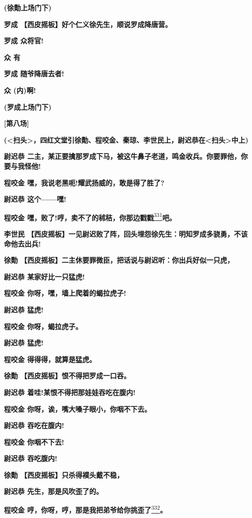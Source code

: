 \textbf{(徐勣上场门下)}

\textbf{罗成 【西皮摇板】好个仁义徐先生，顺说罗成降唐营。}

\textbf{罗成 众将官!}

\textbf{众 有}

\textbf{罗成 随爷降唐去者!}

\textbf{众 (内)啊!}

\textbf{(罗成上场门下)}

\textbf{{[}第八场{]}}

\textbf{(\textless{}扫头\textgreater{}，四红文堂引徐勣、程咬金、秦琼、李世民上，尉迟恭在\textless{}扫头\textgreater{}中上)}

\textbf{尉迟恭
二主，某正要擒那罗成下马，被这牛鼻子老道，鸣金收兵。你要罪他，你要与我怪他!}

\textbf{程咬金 嘿，我说老黑呃!耀武扬威的，敢是得了胜了?}

\textbf{尉迟恭 这个------嘿!}

\textbf{程咬金
嘿，败了!哼，卖不了的秫秸，你那边戳戳}\protect\hyperlink{fn331}{\textsuperscript{331}}\textbf{吧。}

\textbf{李世民
【西皮摇板】一见尉迟败了阵，回头埋怨徐先生：明知罗成多骁勇，不该命他去出兵!}

\textbf{徐勣
【西皮摇板】二主休要罪微臣，把话说与尉迟听：你出兵好似一只虎，}

\textbf{尉迟恭 某家好比一只猛虎!}

\textbf{程咬金 你呀，嘿，墙上爬着的蝎拉虎子!}

\textbf{尉迟恭 猛虎!}

\textbf{程咬金 你呀，蝎拉虎子。}

\textbf{尉迟恭 猛虎!}

\textbf{程咬金 得得得，就算是猛虎。}

\textbf{徐勣 【西皮摇板】恨不得把罗成一口吞。}

\textbf{尉迟恭 着哇!某恨不得把那娃娃吞吃在腹内!}

\textbf{程咬金 你呀，诶，嘴大嗓子眼小，你咽不下去。}

\textbf{尉迟恭 吞吃在腹内!}

\textbf{程咬金 你咽不下去!}

\textbf{尉迟恭 吞吃腹内!}

\textbf{徐勣 【西皮摇板】只杀得襆头戴不稳，}

\textbf{尉迟恭 先生，那是风吹歪了的。}

\textbf{程咬金
哼，你呀，哼，那是我把弟爷给你挑歪了}\protect\hyperlink{fn332}{\textsuperscript{332}}\textbf{。}

